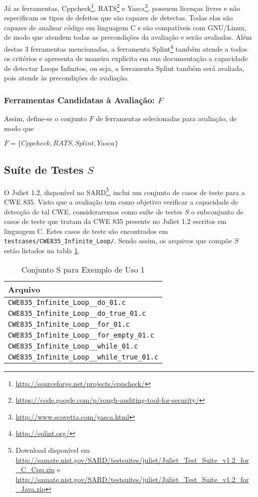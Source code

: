 Já as ferramentas, Cppcheck\footnote{\url{http://sourceforge.net/projects/cppcheck/}}, RATS\footnote{\url{https://code.google.com/p/rough-auditing-tool-for-security/}} e Yasca\footnote{\url{http://www.scovetta.com/yasca.html}}, possuem licenças livres e não especificam os tipos de defeitos que são capazes de detectas. Todas elas são capazes de analisar código em linguagem C e são compatíveis com GNU/Linux, de modo que atendem todas as precondições da avaliação e serão avaliadas. Além destas 3 ferramentas mencionadas, a ferramenta Splint\footnote{\url{http://splint.org/}} também atende a todos os critérios e apresenta de maneira explícita em sua documentação a capacidade de detectar Loops Infinitos, ou seja, a ferramenta Splint também será avaliada, pois atende às precondições de avaliação.

\subsubsection{Ferramentas Candidatas à Avaliação: $F$}

Assim, define-se o conjunto $F$ de ferramentas selecionadas para avaliação, de modo que

$F = \lbrace Cppcheck, RATS, Splint, Yasca\rbrace$

\subsection{Suíte de Testes $S$}

O Juliet 1.2, disponível no SARD\footnote{Download disponível em \url{http://samate.nist.gov/SARD/testsuites/juliet/Juliet_Test_Suite_v1.2_for_C_Cpp.zip} e \url{http://samate.nist.gov/SARD/testsuites/juliet/Juliet_Test_Suite_v1.2_for_Java.zip}}, inclui um conjunto de casos de teste para a CWE 835. Visto que a avaliação tem como objetivo verificar a capacidade de detecção de tal CWE, consideraremos como suíte de testes $S$ o subconjunto de casos de teste que tratam da CWE 835 presente no Juliet 1.2 escritos em linguagem C. Estes casos de teste são encontrados em \lstinline{testcases/CWE835_Infinite_Loop/}. Sendo assim, os arquivos que compõe $S$ estão listados na tabla \ref{tabela_S_eu1}.

\begin{table}
  \centering
\begin{tabular}{| l |}
  \hline
  \textbf{Arquivo} \\ \hline
  \lstinline{CWE835_Infinite_Loop__do_01.c} \\ \hline
  \lstinline{CWE835_Infinite_Loop__do_true_01.c} \\ \hline
  \lstinline{CWE835_Infinite_Loop__for_01.c} \\ \hline
  \lstinline{CWE835_Infinite_Loop__for_empty_01.c} \\ \hline
  \lstinline{CWE835_Infinite_Loop__while_01.c} \\ \hline
  \lstinline{CWE835_Infinite_Loop__while_true_01.c} \\ \hline
\end{tabular}
\caption{Conjunto S para Exemplo de Uso 1}
\label{tabela_S_eu1}
\end{table}

